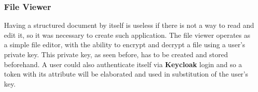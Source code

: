 \subsubsection{File Viewer}
Having a structured document by itself is useless if there is not a way to read and edit it, so it was necessary to create such application. The file viewer operates as a simple file editor, with the ability to encrypt and decrypt a file using a user's private key. 
This private key, as seen before, 
has to be created and stored beforehand. A user could also authenticate itself via \textbf{Keycloak} login and so a token with its attribute will be elaborated and used in substitution of the user's key.